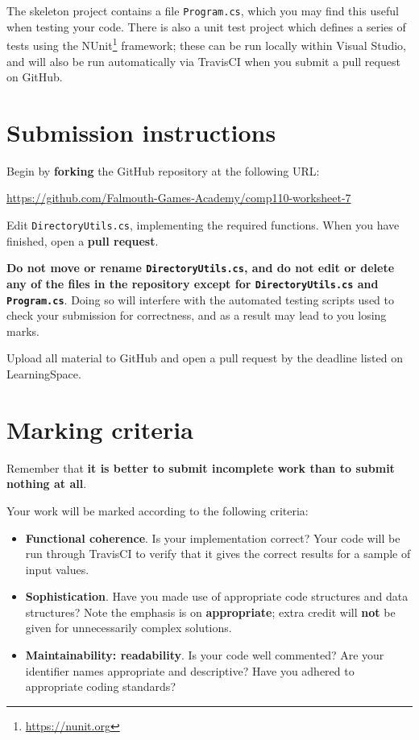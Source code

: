\documentclass{../../../fal_assignment}
\begin{document}
The skeleton project contains a file \texttt{Program.cs}, which you may find this useful when testing your code.
There is also a unit test project which defines a series of tests using the NUnit\footnote{\url{https://nunit.org}} framework;
these can be run locally within Visual Studio, and will also be run automatically via TravisCI when you submit a pull request
on GitHub.

\section*{Submission instructions}

Begin by \textbf{forking} the GitHub repository at the following URL:

\url{https://github.com/Falmouth-Games-Academy/comp110-worksheet-7}

Edit \texttt{DirectoryUtils.cs}, implementing the required functions.
When you have finished, open a \textbf{pull request}.

\textbf{Do not move or rename \texttt{DirectoryUtils.cs}, and do not edit or delete any of the files in the repository except for \texttt{DirectoryUtils.cs} and \texttt{Program.cs}}.
Doing so will interfere with the automated testing scripts used to check your submission for correctness,
and as a result may lead to you losing marks.

Upload all material to GitHub and open a pull request by the deadline listed on LearningSpace.

\section*{Marking criteria}

Remember that \textbf{it is better to submit incomplete work than to submit nothing at all}.

Your work will be marked according to the following criteria:
\begin{itemize}
	\item \textbf{Functional coherence}. Is your implementation correct?
		Your code will be run through TravisCI to verify that it gives the correct results for a sample of input values.
	\item \textbf{Sophistication}. Have you made use of appropriate code structures and data structures?
		Note the emphasis is on \textbf{appropriate}; extra credit will \textbf{not} be given for unnecessarily complex solutions.
	\item \textbf{Maintainability: readability}. Is your code well commented? Are your identifier names appropriate and descriptive?
		Have you adhered to appropriate coding standards?
\end{itemize}
\end{document}
